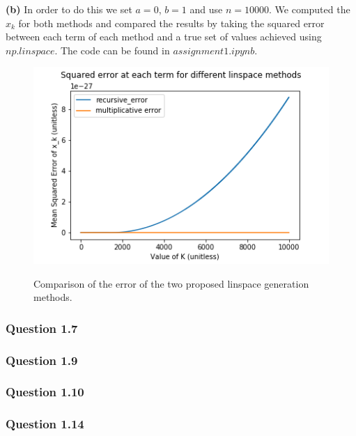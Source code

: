 \documentclass{article}
\begin{document}
\textbf{(b)}
In order to do this we set $a=0$, $b=1$ and use $n=10000$. We computed the $x_k$ for both methods and compared the results by taking the squared error between each term of each method and a true set of values achieved using $np.linspace$. The code can be found in $assignment1.ipynb.$\\

\begin{figure}
	\includegraphics[width=\textwidth]{fig_ch1_cp1_6.png}
	\label{fig:ch1_cp1_6}
	\caption{Comparison of the error of the two proposed linspace generation methods.}
\end{figure}

\subsubsection{Question 1.7}

\subsubsection{Question 1.9}

\subsubsection{Question 1.10}

\subsubsection{Question 1.14}
\end{document}
